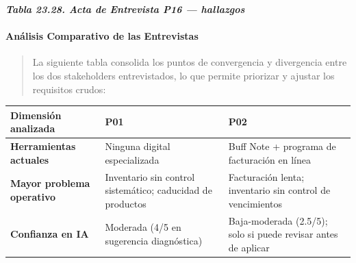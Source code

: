 \documentclass[
]{article}
\newcounter{none} %
\begin{document}
\protect{}\label{_bookmark_P16_hallazgos}{}\emph{\textbf{Tabla 23.28. Acta de Entrevista P16 --- hallazgos}}

\paragraph{Análisis Comparativo de las
Entrevistas}\label{anuxe1lisis-comparativo-de-las-entrevistas}

\begin{quote}
La siguiente tabla consolida los puntos de convergencia y divergencia
entre los dos stakeholders entrevistados, lo que permite priorizar y
ajustar los requisitos crudos:
\end{quote}

{\def\LTcaptype{none} %
\begin{longtable}[]{|
  >{\raggedright\arraybackslash}p{}|
  >{\raggedright\arraybackslash}p{}|
  >{\raggedright\arraybackslash}p{}|}
\hline
\begin{minipage}[b]{\linewidth}\raggedright
\textbf{Dimensión analizada}
\end{minipage} & \begin{minipage}[b]{\linewidth}\raggedright
\textbf{P01}
\end{minipage} & \begin{minipage}[b]{\linewidth}\raggedright
\textbf{P02}
\end{minipage} \\
\hline
\endhead
\hline
\endlastfoot
\textbf{Herramientas actuales} &
\begin{minipage}[t]{\linewidth}\raggedright
Ninguna digital especializada
\end{minipage} & \begin{minipage}[t]{\linewidth}\raggedright
Buff Note + programa de facturación en línea
\end{minipage} \\
\hline
\textbf{Mayor problema operativo} &
\begin{minipage}[t]{\linewidth}\raggedright
Inventario sin control sistemático; caducidad de productos
\end{minipage} & \begin{minipage}[t]{\linewidth}\raggedright
Facturación lenta; inventario sin control de vencimientos
\end{minipage} \\
\hline
\textbf{Confianza en IA} & \begin{minipage}[t]{\linewidth}\raggedright
Moderada (4/5 en sugerencia diagnóstica)
\end{minipage} & \begin{minipage}[t]{\linewidth}\raggedright
Baja-moderada (2.5/5); solo si puede revisar antes de aplicar
\end{minipage} \\
\hline
\end{longtable}
}
\end{document}
